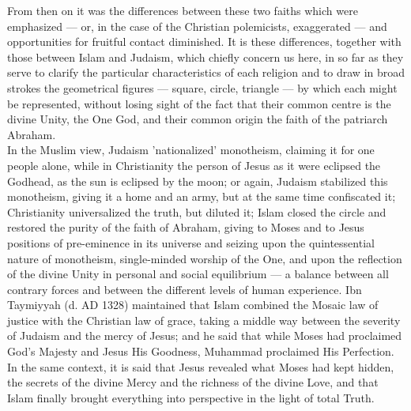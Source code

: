 \documentclass[10pt, twoside,openright]{book}
\begin{document}
From then on it was the differences between these two faiths which were emphasized --- or, in the case 
of the Christian polemicists, exaggerated --- and opportunities for fruitful contact diminished. It is 
these differences, together with those between Islam and Judaism, which chiefly concern us here, in 
so far as they serve to clarify the particular characteristics of each religion and to draw in broad 
strokes the geometrical figures --- square, circle, triangle --- by which each might be represented, 
without losing sight of the fact that their common centre is the divine Unity, the One God, and their 
common origin the faith of the patriarch Abraham. \\

In the Muslim view, Judaism 'nationalized' monotheism, claiming it for one people alone, while in 
Christianity the person of Jesus as it were eclipsed the Godhead, as the sun is eclipsed by the moon; 
or again, Judaism stabilized this monotheism, giving it a home and an army, but at the same time 
confiscated it; Christianity universalized the truth, but diluted it; Islam closed the circle and 
restored the purity of the faith of Abraham, giving to Moses and to Jesus positions of pre\hyp{}eminence 
in its universe and seizing upon the quintessential nature of monotheism, single\hyp{}minded worship of 
the One, and upon the reflection of the divine Unity in personal and social equilibrium --- a balance 
between all contrary forces and between the different levels of human experience. Ibn Taymiyyah (d. 
AD 1328) maintained that Islam combined the Mosaic law of justice with the Christian law of grace, 
taking a middle way between the severity of Judaism and the mercy of Jesus; and he said that while 
Moses had proclaimed God's Majesty and Jesus His Goodness, Muhammad proclaimed His Perfection. In the 
same context, it is said that Jesus revealed what Moses had kept hidden, the secrets of the divine 
Mercy and the richness of the divine Love, and that Islam finally brought everything into perspective 
in the light of total Truth. \\
\end{document}
